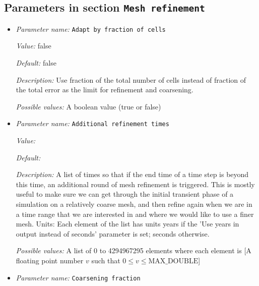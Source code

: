 \subsection{Parameters in section \tt Mesh refinement}
\label{parameters:Mesh_20refinement}

\begin{itemize}
\item {\it Parameter name:} {\tt Adapt by fraction of cells}
\label{parameters:Mesh refinement/Adapt by fraction of cells}
\label{parameters:Mesh_20refinement/Adapt_20by_20fraction_20of_20cells}


{\it Value:} false


{\it Default:} false


{\it Description:} Use fraction of the total number of cells instead of fraction of the total error as the limit for refinement and coarsening.


{\it Possible values:} A boolean value (true or false)
\item {\it Parameter name:} {\tt Additional refinement times}
\label{parameters:Mesh refinement/Additional refinement times}
\label{parameters:Mesh_20refinement/Additional_20refinement_20times}


{\it Value:} 


{\it Default:} 


{\it Description:} A list of times so that if the end time of a time step is beyond this time, an additional round of mesh refinement is triggered. This is mostly useful to make sure we can get through the initial transient phase of a simulation on a relatively coarse mesh, and then refine again when we are in a time range that we are interested in and where we would like to use a finer mesh. Units: Each element of the list has units years if the 'Use years in output instead of seconds' parameter is set; seconds otherwise.


{\it Possible values:} A list of 0 to 4294967295 elements where each element is [A floating point number $v$ such that $0 \leq v \leq \text{MAX\_DOUBLE}$]
\item {\it Parameter name:} {\tt Coarsening fraction}
\label{parameters:Mesh refinement/Coarsening fraction}
\label{parameters:Mesh_20refinement/Coarsening_20fraction}



\end{itemize}
